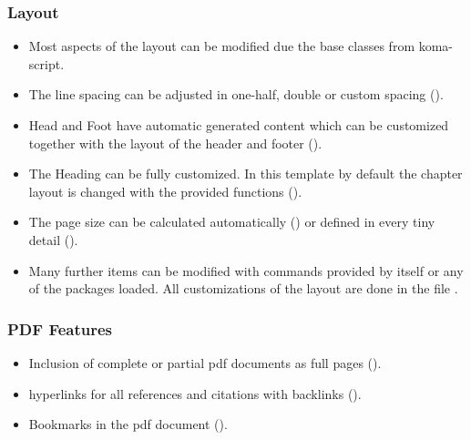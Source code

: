 \subsubsection*{Layout}
\begin{itemize}
\item Most aspects of the layout can be modified due the base classes from koma-script. 
%
\item The line spacing can be adjusted in one-half, double or custom spacing ().
%
\item Head and Foot have automatic generated content which can be customized together with the layout of the header and footer ().
%
\item The Heading can be fully customized. In this template by default the chapter layout is changed with the provided functions ().
%
\item The page size can be calculated automatically () or defined in every tiny detail ().
%
\item Many further items can be modified with commands provided by \latex itself or any of the packages loaded. All customizations of the layout are done in the file .
\end{itemize}

\subsubsection*{PDF Features}
\begin{itemize}
\item Inclusion of complete or partial pdf documents as full pages ().
%
\item hyperlinks for all references and citations with backlinks ().
%
\item Bookmarks in the pdf document ().
\end{itemize}


